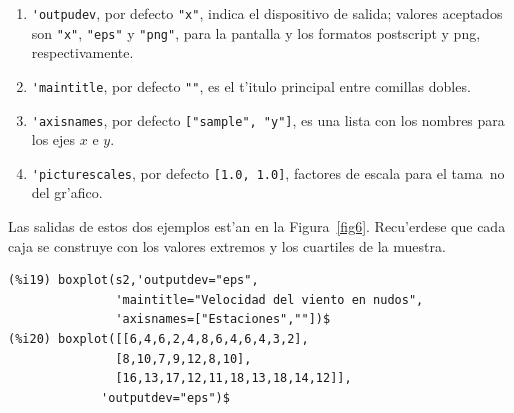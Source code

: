 \documentclass[spanish,12pt,a4paper]{article}
\begin{document}
\begin{description}
\begin{enumerate}
\item \verb|'outpudev|, por defecto \verb|"x"|, indica el dispositivo de salida; valores aceptados son \verb|"x"|, \verb|"eps"| y \verb|"png"|, para la pantalla y los formatos postscript y png, respectivamente.
\item \verb|'maintitle|, por defecto \verb|""|, es el t'itulo principal entre comillas dobles.
\item \verb|'axisnames|, por defecto \verb|["sample", "y"]|,  es una lista con los nombres para los ejes $x$ e $y$.
\item \verb|'picturescales|, por defecto \verb|[1.0, 1.0]|, factores de escala para el tama~no del gr'afico.
\end{enumerate}

Las salidas de estos dos ejemplos est'an en la Figura~\ref{fig6}. Recu'erdese que cada caja se construye con los valores extremos y los cuartiles de la muestra.
\begin{verbatim}
(%i19) boxplot(s2,'outputdev="eps",
               'maintitle="Velocidad del viento en nudos",
               'axisnames=["Estaciones",""])$
(%i20) boxplot([[6,4,6,2,4,8,6,4,6,4,3,2],
               [8,10,7,9,12,8,10],
               [16,13,17,12,11,18,13,18,14,12]],
             'outputdev="eps")$
\end{verbatim}



\end{description}
\end{document}
